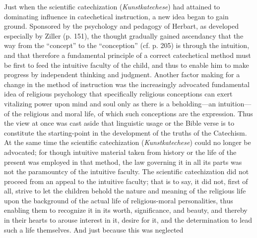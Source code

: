 Just when the scientific catechization (\emph{Kunstkatechese}) had attained to dominating influence in catechetical instruction, a new idea began to gain ground. Sponsored by the psychology and pedagogy of Herbart, as developed especially by Ziller (p. 151), the thought gradually gained ascendancy that the way from the “concept” to the “conception” (cf. p. 205) is through the intuition, and that therefore a fundamental principle of a correct catechetical method must be first to feed the intuitive faculty of the child, and thus to enable him to make progress by independent thinking and judgment. Another factor making for a change in the method of instruction was the increasingly advocated fundamental idea of religious psychology that specifically religious conceptions can exert vitalizing power upon mind and soul only as there is a beholding—an intuition—of the religious and moral life, of which such conceptions are the expression. Thus the view at once was cast aside that linguistic usage or the Bible verse is to constitute the starting-point in the development of the truths of the Catechism. At the same time the scientific catechization (\emph{Kunstkatechese}) could no longer be advocated; for though intuitive material taken from history or the life of the present was employed in that method, the law governing it in all its parts was not the paramountcy of the intuitive faculty. The scientific catechization did not proceed from an appeal to the intuitive faculty; that is to say, it did not, first of all, strive to let the children behold the nature and meaning of the religious life upon the background of the actual life of religious-moral personalities, thus enabling them to recognize it in its worth, significance, and beauty, and thereby in their hearts to arouse interest in it, desire for it, and the determination to lead such a life themselves. And just because this was neglected
